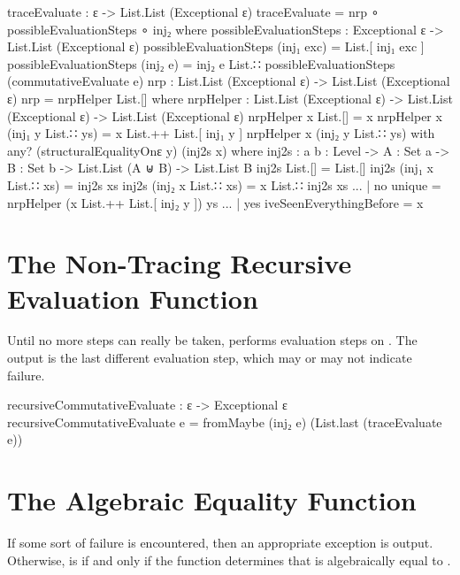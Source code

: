 \documentclass{report}
\begin{document}
\begin{code}
traceEvaluate : ε -> List.List (Exceptional ε)
traceEvaluate = nrp ∘ possibleEvaluationSteps ∘ inj₂
  where
  possibleEvaluationSteps : Exceptional ε -> List.List (Exceptional ε)
  possibleEvaluationSteps (inj₁ exc) = List.[ inj₁ exc ]
  possibleEvaluationSteps (inj₂ e) = inj₂ e List.∷ possibleEvaluationSteps (commutativeEvaluate e)
  nrp : List.List (Exceptional ε) -> List.List (Exceptional ε)
  nrp = nrpHelper List.[]
    where
    nrpHelper : List.List (Exceptional ε) -> List.List (Exceptional ε) -> List.List (Exceptional ε)
    nrpHelper x List.[] = x
    nrpHelper x (inj₁ y List.∷ ys) = x List.++ List.[ inj₁ y ]
    nrpHelper x (inj₂ y List.∷ ys) with any? (structuralEqualityOnε y) (inj2s x)
      where
      inj2s : {a b : Level} ->
              {A : Set a} ->
              {B : Set b} ->
              List.List (A ⊎ B) ->
              List.List B
      inj2s List.[] = List.[]
      inj2s (inj₁ x List.∷ xs) = inj2s xs
      inj2s (inj₂ x List.∷ xs) = x List.∷ inj2s xs
    ... | no unique = nrpHelper (x List.++ List.[ inj₂ y ]) ys
    ... | yes iveSeenEverythingBefore = x
\end{code}

\section{The Non-Tracing Recursive Evaluation Function}
Until no more steps can really be taken,   performs evaluation steps on .  The output is the last different evaluation step, which may or may not indicate failure.

\begin{code}
recursiveCommutativeEvaluate : ε -> Exceptional ε
recursiveCommutativeEvaluate e = fromMaybe (inj₂ e) (List.last (traceEvaluate e))
\end{code}

\section{The Algebraic Equality Function}
If some sort of failure is encountered, then an appropriate exception is output.  Otherwise,    is   if and only if the function determines that  is algebraically equal to .
\end{document}
